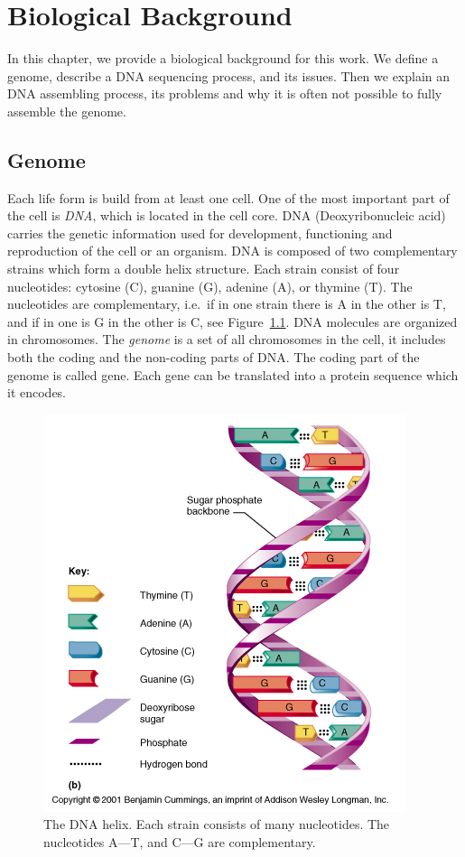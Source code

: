 \chapter{Biological Background}\label{chap:biointro}

In this chapter, we provide a biological background for this work.
We define a genome, describe a DNA sequencing process, and its issues. Then we explain an DNA assembling process, its problems and why it is often not possible to fully assemble the genome.

\section{Genome}

Each life form is build from at least one cell. One of the most important part of the cell is \emph{DNA}, which is located in the cell core.
DNA (Deoxyribonucleic acid) carries the genetic information used for development, functioning and reproduction of the cell or an organism.
DNA is composed of two complementary strains which form a double helix structure. Each strain consist of four nucleotides: cytosine (C), guanine (G), adenine (A), or thymine (T).
The nucleotides are complementary, i.e.\ if in one strain there is A in the other is T, and if in one is G in the other is C, see Figure~\ref{fig:dnahelix}.
DNA molecules are organized in chromosomes.
The \emph{genome} is a set of all chromosomes in the cell, it includes both the coding and the non-coding parts of DNA.\@
The coding part of the genome is called gene. Each gene can be translated into a protein sequence which it encodes.

\begin{figure}[htbp]
  \centering
  \includegraphics[width=.5\textwidth]{../figures/dna-helix}
  \caption[DNA helix]{The DNA helix. Each strain consists of many nucleotides. The nucleotides A---T, and C---G are complementary.\cite{dnahelix}}\label{fig:dnahelix}
\end{figure}

